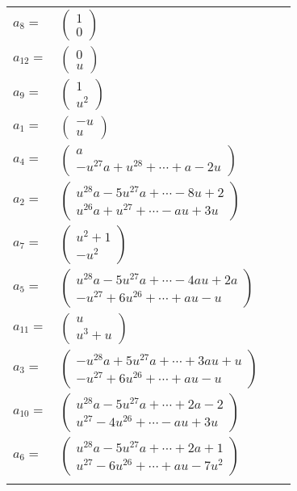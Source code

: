 \documentclass[1p]{elsarticle_modified}
\theoremstyle{definition}
\begin{document}
\begin{tabular}{m{7pt} m{180pt} m{7pt} m{180pt} }
\flushright $a_{8}=$&$\begin{pmatrix}1\\0\end{pmatrix}$ \\
\flushright $a_{12}=$&$\begin{pmatrix}0\\u\end{pmatrix}$ \\
\flushright $a_{9}=$&$\begin{pmatrix}1\\u^2\end{pmatrix}$ \\
\flushright $a_{1}=$&$\begin{pmatrix}- u\\u\end{pmatrix}$ \\
\flushright $a_{4}=$&$\begin{pmatrix}a\\- u^{27} a+u^{28}+\cdots+a-2 u\end{pmatrix}$ \\
\flushright $a_{2}=$&$\begin{pmatrix}u^{28} a-5 u^{27} a+\cdots-8 u+2\\u^{26} a+u^{27}+\cdots- a u+3 u\end{pmatrix}$ \\
\flushright $a_{7}=$&$\begin{pmatrix}u^2+1\\- u^2\end{pmatrix}$ \\
\flushright $a_{5}=$&$\begin{pmatrix}u^{28} a-5 u^{27} a+\cdots-4 a u+2 a\\- u^{27}+6 u^{26}+\cdots+a u- u\end{pmatrix}$ \\
\flushright $a_{11}=$&$\begin{pmatrix}u\\u^3+u\end{pmatrix}$ \\
\flushright $a_{3}=$&$\begin{pmatrix}- u^{28} a+5 u^{27} a+\cdots+3 a u+u\\- u^{27}+6 u^{26}+\cdots+a u- u\end{pmatrix}$ \\
\flushright $a_{10}=$&$\begin{pmatrix}u^{28} a-5 u^{27} a+\cdots+2 a-2\\u^{27}-4 u^{26}+\cdots- a u+3 u\end{pmatrix}$ \\
\flushright $a_{6}=$&$\begin{pmatrix}u^{28} a-5 u^{27} a+\cdots+2 a+1\\u^{27}-6 u^{26}+\cdots+a u-7 u^2\end{pmatrix}$\\&\end{tabular}
\end{document}
